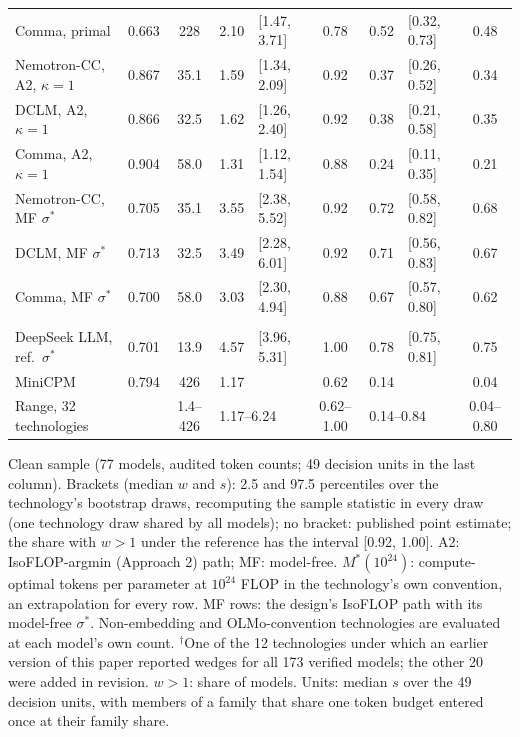 \begin{table}[tp]
\begin{tabular*}{\textwidth}{@{\extracolsep{\fill}}lccr@{\,}lcr@{\,}lc@{}}
\quad Comma, primal & 0.663 & 228 & 2.10 & {\footnotesize [1.47, 3.71]} & 0.78 & 0.52 & {\footnotesize [0.32, 0.73]} & 0.48 \\
\quad Nemotron-CC, A2, $\kappa=1$ & 0.867 & 35.1 & 1.59 & {\footnotesize [1.34, 2.09]} & 0.92 & 0.37 & {\footnotesize [0.26, 0.52]} & 0.34 \\
\quad DCLM, A2, $\kappa=1$ & 0.866 & 32.5 & 1.62 & {\footnotesize [1.26, 2.40]} & 0.92 & 0.38 & {\footnotesize [0.21, 0.58]} & 0.35 \\
\quad Comma, A2, $\kappa=1$ & 0.904 & 58.0 & 1.31 & {\footnotesize [1.12, 1.54]} & 0.88 & 0.24 & {\footnotesize [0.11, 0.35]} & 0.21 \\
\quad Nemotron-CC, MF $\sigma^*$ & 0.705 & 35.1 & 3.55 & {\footnotesize [2.38, 5.52]} & 0.92 & 0.72 & {\footnotesize [0.58, 0.82]} & 0.68 \\
\quad DCLM, MF $\sigma^*$ & 0.713 & 32.5 & 3.49 & {\footnotesize [2.28, 6.01]} & 0.92 & 0.71 & {\footnotesize [0.56, 0.83]} & 0.67 \\
\quad Comma, MF $\sigma^*$ & 0.700 & 58.0 & 3.03 & {\footnotesize [2.30, 4.94]} & 0.88 & 0.67 & {\footnotesize [0.57, 0.80]} & 0.62 \\
\addlinespace[2pt]
\multicolumn{9}{@{}l}{\textit{Published laws}} \\
\quad DeepSeek LLM, ref.\ $\sigma^*$ & 0.701 & 13.9 & 4.57 & {\footnotesize [3.96, 5.31]} & 1.00 & 0.78 & {\footnotesize [0.75, 0.81]} & 0.75 \\
\quad MiniCPM & 0.794 & 426 & 1.17 &  & 0.62 & 0.14 &  & 0.04 \\
\midrule
Range, 32 technologies & & 1.4--426 & \multicolumn{2}{l}{1.17--6.24} & 0.62--1.00 & \multicolumn{2}{l}{0.14--0.84} & 0.04--0.80 \\
\bottomrule
\end{tabular*}
\par\smallskip
\begin{tablenotes}
Clean sample (77 models, audited token counts; 49 decision units in the last column). Brackets (median $w$ and $s$): 2.5 and 97.5 percentiles over the technology's bootstrap draws, recomputing the sample statistic in every draw (one technology draw shared by all models); no bracket: published point estimate; the share with $w>1$ under the reference has the interval [0.92, 1.00]. A2: IsoFLOP-argmin (Approach 2) path; MF: model-free. $M^*(10^{24})$: compute-optimal tokens per parameter at $10^{24}$ FLOP in the technology's own convention, an extrapolation for every row. MF rows: the design's IsoFLOP path with its model-free $\sigma^*$. Non-embedding and OLMo-convention technologies are evaluated at each model's own count. $^\dagger$One of the 12 technologies under which an earlier version of this paper reported wedges for all 173 verified models; the other 20 were added in revision. $w>1$: share of models. Units: median $s$ over the 49 decision units, with members of a family that share one token budget entered once at their family share.

\end{tablenotes}
\end{table}
